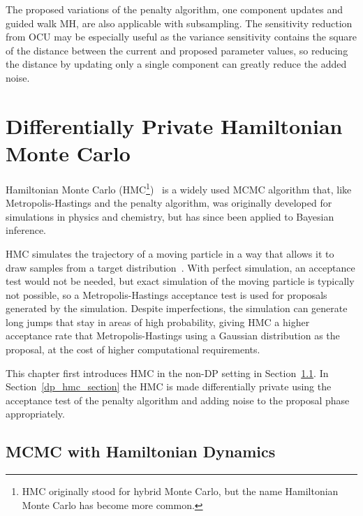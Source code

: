 \documentclass[english,twoside,openright]{HYgraduMLDS}
\begin{document}
The proposed variations of the penalty algorithm, one component updates and guided
walk MH, are also applicable with subsampling. The sensitivity reduction from
OCU may be especially useful as the variance sensitivity contains the square of
the distance between the current and proposed parameter values, so reducing the
distance by updating only a single component can greatly reduce the added noise.

\chapter{Differentially Private Hamiltonian Monte Carlo}

Hamiltonian Monte Carlo (HMC\footnote{
    HMC originally stood for hybrid Monte Carlo, 
    but the name Hamiltonian Monte Carlo has become more common.
})~\cite{DKP87, neal2012mcmc} is a widely used MCMC algorithm that, like
Metropolis-Hastings and the penalty algorithm, was originally developed 
for simulations in physics and chemistry, but has since been applied to 
Bayesian inference. 

HMC simulates the trajectory of a moving particle in a way 
that allows it to draw samples from a target distribution~\cite{neal2012mcmc}. 
With perfect simulation,
an acceptance test would not be needed, but exact simulation of the moving particle 
is typically not possible, so a Metropolis-Hastings acceptance test is used
for proposals generated by the simulation. Despite imperfections, the simulation can generate long jumps
that stay in areas of high probability, giving HMC a higher acceptance rate 
that Metropolis-Hastings using a Gaussian distribution as the proposal, at the 
cost of higher computational requirements.

This chapter first introduces HMC in the non-DP setting in Section~\ref{hmc_basics_section}.
In Section~\ref{dp_hmc_section} the HMC is made differentially private using the 
acceptance test of the penalty algorithm and adding noise to the proposal phase 
appropriately.

\section{MCMC with Hamiltonian Dynamics}\label{hmc_basics_section}
\end{document}
